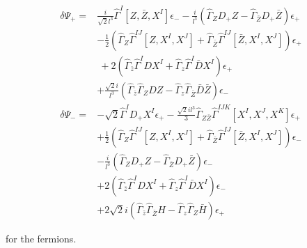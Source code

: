 \documentclass[12pt]{article}
\newcommand{\nn}{\nonumber}
\numberwithin{equation}{section}
\begin{document}
\begin{align}
\delta \Psi_+  
=&   \frac{i}{\sqrt{2}l^3} \hat{\Gamma}^I \left[ Z, \bar{Z}, X^I  \right] \epsilon_- - \frac{i}{l^3} \left( \hat{\Gamma}_Z D_+ Z -  \hat{\Gamma}_{\bar{Z}} D_+ \bar{Z}  \right) \epsilon_+ \nonumber \\ & - \frac{1}{2} \left( \hat{\Gamma}_Z \hat{\Gamma}^{IJ} \left[ Z, X^I, X^J  \right] + \hat{\Gamma}_{\bar{Z}} \hat{\Gamma}^{IJ} \left[ \bar{Z}, X^I, X^J  \right]  \right)\epsilon_+ \nonumber \\ &\  + 2 \left( \hat{\Gamma}_{\bar{z}} \hat{\Gamma}^I D X^I + \hat{\Gamma}_{{z}} \hat{\Gamma}^I \bar{D} X^I  \right) \epsilon_+ \nonumber \\ & + \frac{\sqrt{2}i}{l^3} \left(  \hat{\Gamma}_{\bar{z}} \hat{\Gamma}_Z D Z - \hat{\Gamma}_z \hat{\Gamma}_{\bar{Z}}\bar D\bar{Z}\right) \epsilon_-\nn\\
\delta \Psi_-  =& -\sqrt{2} \hat{\Gamma}^I D_+ X^I \epsilon_+ - \frac{ \sqrt{2}i l^3}{3}\hat{\Gamma}_{Z \bar{Z}} \hat{\Gamma}^{IJK} \left[ X^I, X^J, X^K  \right] \epsilon_+   \nonumber \\ & + \frac{1}{2} \left( \hat{\Gamma}_Z \hat{\Gamma}^{IJ} \left[ Z, X^I, X^J  \right] + \hat{\Gamma}_{\bar{Z}} \hat{\Gamma}^{IJ} \left[ \bar{Z}, X^I, X^J  \right]  \right)\epsilon_- \nonumber \\  &- \frac{i}{l^3} \left( \hat{\Gamma}_Z D_+ Z - \hat{\Gamma}_{\bar{Z}} D_+ \bar{Z}  \right) \epsilon_- \nonumber \\ & + 2 \left( \hat{\Gamma}_{\bar{z}} \hat{\Gamma}^I D X^I + \hat{\Gamma}_{{z}} \hat{\Gamma}^I \bar{D} X^I  \right) \epsilon_- \nonumber \\ & +2 \sqrt{2}i \left( \hat{\Gamma}_{\bar{z}}\hat{\Gamma}_{\bar{Z}} H - \hat{\Gamma}_z  \hat{\Gamma}_Z \bar{H} \right)  \epsilon_+\ 
\end{align}

for the fermions.
\end{document}
